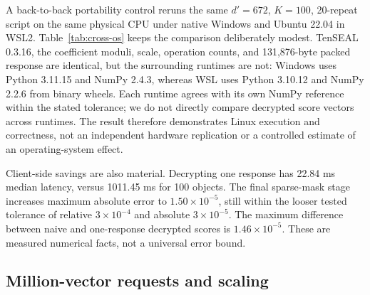 \documentclass[pdflatex,sn-basic,Numbered]{sn-jnl}
\theoremstyle{plain}
\begin{document}
A back-to-back portability control reruns the same $d'=672$, $K=100$, 20-repeat script on the same physical CPU under native Windows and Ubuntu 22.04 in WSL2. Table~\ref{tab:cross-os} keeps the comparison deliberately modest. TenSEAL 0.3.16, the coefficient moduli, scale, operation counts, and 131,876-byte packed response are identical, but the surrounding runtimes are not: Windows uses Python 3.11.15 and NumPy 2.4.3, whereas WSL uses Python 3.10.12 and NumPy 2.2.6 from binary wheels. Each runtime agrees with its own NumPy reference within the stated tolerance; we do not directly compare decrypted score vectors across runtimes. The result therefore demonstrates Linux execution and correctness, not an independent hardware replication or a controlled estimate of an operating-system effect.

\begin{table}[t]
\caption{Same-CPU Windows/WSL portability control. Times are provider milliseconds; speedup is naive p50 divided by one-response p50. The primary Windows result remains Table~\ref{tab:microbenchmark}.}\label{tab:cross-os}
\centering
\scriptsize
{}
\end{table}

Client-side savings are also material. Decrypting one response has 22.84 ms median latency, versus 1011.45 ms for 100 objects. The final sparse-mask stage increases maximum absolute error to $1.50\times10^{-5}$, still within the looser tested tolerance of relative $3\times10^{-4}$ and absolute $3\times10^{-5}$. The maximum difference between naive and one-response decrypted scores is $1.46\times10^{-5}$. These are measured numerical facts, not a universal error bound.

\subsection{Million-vector requests and scaling}\label{subsec:unified-results}
\end{document}
